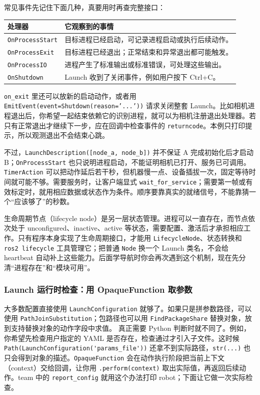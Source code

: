 常见事件先记住下面几种，真要用时再查完整接口：
\begin{center}
\begin{tabular}{p{}p{}}
\toprule[1.5pt]
处理器 & 它观察到的事情 \\
\midrule[1pt]
\texttt{OnProcessStart} & 目标进程已经启动，可记录进程启动或执行后续动作。\\
\texttt{OnProcessExit} & 目标进程已经退出；正常结束和异常退出都可能触发。\\
\texttt{OnProcessIO} & 进程产生了标准输出或标准错误，可处理这些输出。\\
\texttt{OnShutdown} & Launch 收到了关闭事件，例如用户按下 Ctrl+C。\\
\bottomrule[1.5pt]
\end{tabular}
\end{center}

\texttt{on\_exit} 里还可以放新的启动动作，或者用 \texttt{EmitEvent(event=Shutdown(reason='...'))} 请求关闭整套 Launch。比如相机进程退出后，你希望一起结束依赖它的识别进程，就可以为相机注册退出处理器。若只有正常退出才继续下一步，应在回调中检查事件的 \texttt{returncode}。本例只打印提示，所以观测退出不会结束心跳。

不过，\nolinkurl{LaunchDescription([node_a, node_b])} 并不保证 A 完成初始化后才启动 B；\texttt{OnProcessStart} 也只说明进程启动，不能证明相机已打开、服务已可调用。\texttt{TimerAction} 可以把动作延后若干秒，但机器慢一点、设备插拔一次，固定等待时间就可能不够。需要服务时，让客户端显式 \nolinkurl{wait_for_service}；需要第一帧或有效标定时，就用相应数据或状态作为条件。顺序要靠真实的就绪信号，不能靠猜一个“应该够了”的秒数。

生命周期节点（lifecycle node）是另一层状态管理。进程可以一直存在，而节点依次处于 unconfigured、inactive、active 等状态，需要配置、激活后才承担相应工作。只有程序本身实现了生命周期接口，才能用 \texttt{LifecycleNode}、状态转换和 \texttt{ros2 lifecycle} 工具管理它；把普通 \texttt{Node} 换一个 Launch 类名，不会给 heartbeat 自动补上这些能力。后面学导航时你会再次遇到这个机制，现在先分清“进程存在”和“模块可用”。

\subsubsection{Launch 运行时检查：用 OpaqueFunction 取参数}
大多数配置直接使用 \nolinkurl{LaunchConfiguration} 就够了。如果只是拼参数路径，可以使用 \nolinkurl{PathJoinSubstitution}；包路径也可以用 \nolinkurl{FindPackageShare} 替换对象，放到支持替换对象的动作字段中求值。
真正需要 Python 判断时就不同了。例如，你希望先检查用户指定的 YAML 是否存在，检查通过才引入子文件。这时候 \nolinkurl{Path(LaunchConfiguration('params_file'))} 还拿不到实际路径，\texttt{str(...)} 也只会得到对象的描述。\texttt{OpaqueFunction} 会在动作执行阶段把当前上下文（context）交给回调，让你用 \texttt{.perform(context)} 取出实际值，再返回后续动作。team 中的 \texttt{report\_config} 就用这个办法打印 robot；下面让它做一次实际检查。


